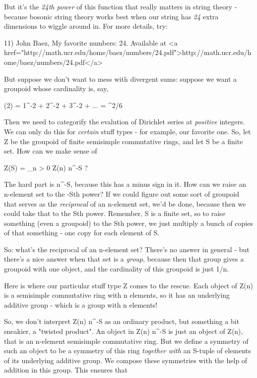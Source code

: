 But it's the \emph{24th power} of this function that really matters in
string theory - because bosonic string theory works best when our
string has \emph{24} extra dimensions to wiggle around in.  For more
details, try:

11) John Baez, My favorite numbers: 24.  Available at <a
href="http://math.ucr.edu/home/baez/numbers/24.pdf">http://math.ucr.edu/home/baez/numbers/24.pdf</a>

But suppose we don't want to mess with divergent sums: suppose we want
a groupoid whose cardinality is, say,

\zeta (2) = 1^{-2} + 2^{-2} + 3^{-2} + ... =
\pi ^{2}/6

Then we need to categorify the evalution of Dirichlet series at
\emph{positive} integers.  We can only do this for \emph{certain}
stuff types - for example, our favorite one.  So, let Z be the
groupoid of finite semisimple commutative rings, and let S be a finite
set.  How can we make sense of

Z(S) = \sum_{n > 0} Z(n) \times  n^{-S} ?

The hard part is n^{-S}, because this has a minus sign in it.
How can we raise an n-element set to the -Sth power?  If we could
figure out some sort of groupoid that serves as the \emph{reciprocal}
of an n-element set, we'd be done, because then we could take that to
the Sth power.  Remember, S is a finite set, so to raise something
(even a groupoid) to the Sth power, we just multiply a bunch of copies
of that something - one copy for each element of S.

So: what's the reciprocal of an n-element set?  There's no answer in
general - but there's a nice answer when that set is a \emph{group},
because then that group gives a groupoid with one object, and the
cardinality of this groupoid is just 1/n.

Here is where our particular stuff type Z comes to the rescue.  Each
object of Z(n) is a semisimple commutative ring with n elements, so it
has an underlying additive group - which is a group with n elements!

So, we don't interpret Z(n) \times  n^{-S} as an ordinary
product, but something a bit sneakier, a "twisted product".  An object
in Z(n) \times  n^{-S} is just an object of Z(n), that is an
n-element semisimple commutative ring.  But we define a symmetry of
such an object to be a symmetry of this ring \emph{together with} an
S-tuple of elements of its underlying additive group.  We compose
these symmetries with the help of addition in this group.  This
ensures that

